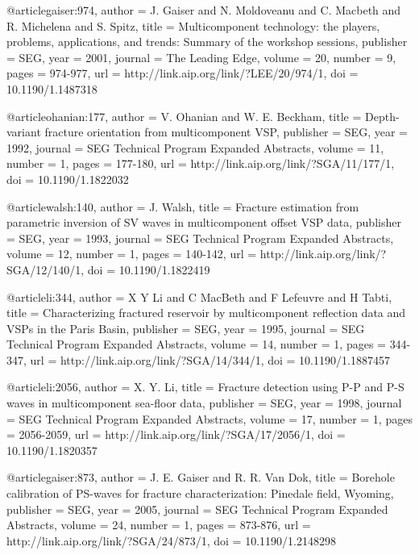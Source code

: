 {@article{gaiser:974,
  author =	 {J. Gaiser and N. Moldoveanu and C. Macbeth
                  and R. Michelena and S. Spitz},
  title =	 {Multicomponent technology: the players, problems,
                  applications, and trends: Summary of the workshop
                  sessions},
  publisher =	 {SEG},
  year =	 2001,
  journal =	 {The Leading Edge},
  volume =	 20,
  number =	 9,
  pages =	 {974-977},
  url =		 {http://link.aip.org/link/?LEE/20/974/1},
  doi =		 {10.1190/1.1487318}
}

@article{ohanian:177,
  author =	 {V. Ohanian and W. E. Beckham},
  title =	 {Depth-variant fracture orientation from
                  multicomponent VSP},
  publisher =	 {SEG},
  year =	 1992,
  journal =	 {SEG Technical Program Expanded Abstracts},
  volume =	 11,
  number =	 1,
  pages =	 {177-180},
  url =		 {http://link.aip.org/link/?SGA/11/177/1},
  doi =		 {10.1190/1.1822032}
}

@article{walsh:140,
  author =	 {J. Walsh},
  title =	 {Fracture estimation from parametric inversion of
                  {SV} waves in multicomponent offset VSP data},
  publisher =	 {SEG},
  year =	 1993,
  journal =	 {SEG Technical Program Expanded Abstracts},
  volume =	 12,
  number =	 1,
  pages =	 {140-142},
  url =		 {http://link.aip.org/link/?SGA/12/140/1},
  doi =		 {10.1190/1.1822419}
}

@article{li:344,
  author =	 {X Y Li and C MacBeth and F
                  Lefeuvre and H Tabti},
  title =	 {Characterizing fractured reservoir by multicomponent
                  reflection data and {VSP}s in the Paris Basin},
  publisher =	 {SEG},
  year =	 1995,
  journal =	 {SEG Technical Program Expanded Abstracts},
  volume =	 14,
  number =	 1,
  pages =	 {344-347},
  url =		 {http://link.aip.org/link/?SGA/14/344/1},
  doi =		 {10.1190/1.1887457}
}

@article{li:2056,
  author =	 {X. Y. Li},
  title =	 {Fracture detection using {P}-{P} and {P}-{S} waves
                  in multicomponent sea-floor data},
  publisher =	 {SEG},
  year =	 1998,
  journal =	 {SEG Technical Program Expanded Abstracts},
  volume =	 17,
  number =	 1,
  pages =	 {2056-2059},
  url =		 {http://link.aip.org/link/?SGA/17/2056/1},
  doi =		 {10.1190/1.1820357}
}

@article{gaiser:873,
  author =	 {J. E. Gaiser and R. R. Van Dok},
  title =	 {Borehole calibration of PS-waves for fracture
                  characterization: Pinedale field, Wyoming},
  publisher =	 {SEG},
  year =	 2005,
  journal =	 {SEG Technical Program Expanded Abstracts},
  volume =	 24,
  number =	 1,
  pages =	 {873-876},
  url =		 {http://link.aip.org/link/?SGA/24/873/1},
  doi =		 {10.1190/1.2148298}
}

}
